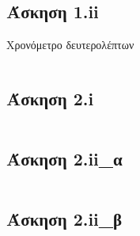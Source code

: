 \documentclass[a4paper,10pt]{article} \usepackage{anysize}
\begin{document}


\section*{} \setcounter{section}{1}
\subsection*{Άσκηση 1.ii}\setcounter{subsection}{1}
Χρονόμετρο δευτερολέπτων

\inputminted[linenos,obeytabs,fontsize=\footnotesize]{oldasm}{../askhsh_1_ii.8085}
\subsection*{Άσκηση 2.i}
\inputminted[linenos,obeytabs,fontsize=\footnotesize]{oldasm}{../askhsh_2_i.8085}
\subsection*{Άσκηση 2.ii\_α}
\inputminted[linenos,obeytabs,fontsize=\footnotesize]{oldasm}{../askhsh_2_ii_a.8085}
\subsection*{Άσκηση 2.ii\_β}
\inputminted[linenos,obeytabs,fontsize=\footnotesize]{oldasm}{../askhsh_2_ii_b.8085}
\end{document}
